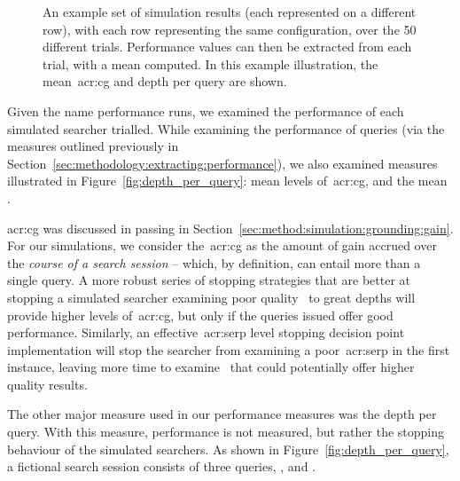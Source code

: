 \begin{figure}[t!]
    \centering
    \caption[Example of how an average of measures was computed]{An example set of simulation results (each represented on a different row), with each row representing the same configuration, over the 50 different trials. Performance values can then be extracted from each trial, with a mean computed. In this example illustration, the mean~\gls{acr:cg} and depth per query are shown.}
    \label{fig:example_sim_configuration}
\end{figure}

Given the name performance runs, we examined the performance of each simulated searcher trialled. While examining the performance of queries (via the measures outlined previously in Section~\ref{sec:methodology:extracting:performance}), we also examined measures illustrated in Figure~\ref{fig:depth_per_query}: mean levels of~\gls{acr:cg}, and the mean .

\gls{acr:cg} was discussed in passing in Section~\ref{sec:method:simulation:grounding:gain}. For our simulations, we consider the~\gls{acr:cg} as the amount of gain accrued over the \emph{course of a search session} -- which, by definition, can entail more than a single query. A more robust series of stopping strategies that are better at stopping a simulated searcher examining poor quality~ to great depths will provide higher levels of~\gls{acr:cg}, but only if the queries issued offer good performance. Similarly, an effective~\gls{acr:serp} level stopping decision point implementation will stop the searcher from examining a poor~\gls{acr:serp} in the first instance, leaving more time to examine~ that could potentially offer higher quality results.

The other major measure used in our performance measures was the depth per query. With this measure, performance is not measured, but rather the stopping behaviour of the simulated searchers. As shown in Figure~\ref{fig:depth_per_query}, a fictional search session consists of three queries, ,  and .

